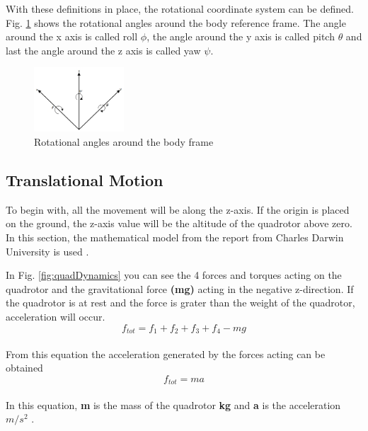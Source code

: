 With these definitions in place, the rotational coordinate system can be defined. Fig. \ref{fig:quadAngles} shows the rotational angles around the body reference frame. The angle around the x axis is called roll $\phi$, the angle around the y axis is called pitch $\theta$ and last the angle around the z axis is called yaw $\psi$.\bigskip

\begin{figure}[H]
    \centering
    \includegraphics[width = 0.3\textwidth]{VAPIQ-PICTURES/RPJ.jpg}
    \caption{Rotational angles around the body frame}
    \label{fig:quadAngles}
\end{figure}
\bigskip
 
\subsection{Translational Motion}

To begin with, all the movement will be along the z-axis. If the origin is placed on the ground, the z-axis value will be the altitude of the quadrotor above zero. In this section, the mathematical model from the report from Charles Darwin University is used \cite{charlesdarwinuni}. \bigskip

In Fig. \ref{fig:quadDynamics} you can see the 4 forces and torques acting on the quadrotor and the gravitational force \textbf{(mg)} acting in the negative z-direction. If the quadrotor is at rest and the force is grater than the weight of the quadrotor, acceleration will occur. 
\begin{equation}
  f_{tot} = f_1 + f_2 + f_3 + f_4 - mg
\end{equation}
\\
From this equation the acceleration generated by the forces acting can be obtained 
\\
\begin{equation}
  f_{tot} = ma
\end{equation}
\\
In this equation, \textbf{m} is the mass of the quadrotor \textbf{kg} and \textbf{a} is the acceleration \textbf{$m/s^2$} .\bigskip

